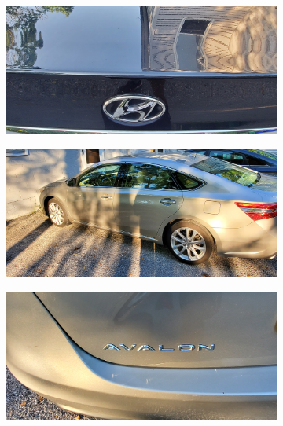 \documentclass[12pt]{article}
\begin{document}
\begin{figure}[!ht]
\begin{subfigure}[b]{0.4\textwidth}
        \caption{}
    \end{subfigure}
    \hspace{2 pt}
    \begin{subfigure}[b]{0.4\textwidth}
        \centering
        \includegraphics[width=\textwidth]{images/car_photos/20210703_192806.jpg} %
        \caption{}
    \end{subfigure}
    \begin{subfigure}[b]{0.4\textwidth}
        \centering
        \includegraphics[width=\textwidth]{images/car_photos/20210703_192822.jpg} %
        \caption{}
    \end{subfigure}
    \hspace{2 pt}
    \begin{subfigure}[b]{0.4\textwidth}
        \centering
        \includegraphics[width=\textwidth]{images/car_photos/20210703_192830.jpg} %

\end{subfigure}
\end{figure}
\end{document}
